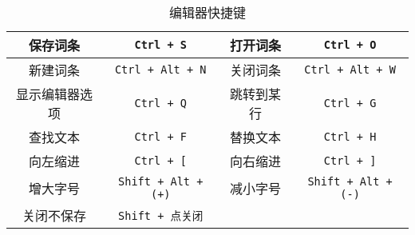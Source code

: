 \begin{table}[ht]
\centering
\caption{编辑器快捷键}\label{editor_tab1}
\begin{tabular}{|c|c|c|c|}
\hline
保存词条 & \lstinline|Ctrl + S| & 打开词条 & \lstinline|Ctrl + O| \\
\hline
新建词条 & \lstinline|Ctrl + Alt + N| & 关闭词条 & \lstinline|Ctrl + Alt + W| \\
\hline
显示编辑器选项 & \lstinline|Ctrl + Q| & 跳转到某行 & \lstinline|Ctrl + G| \\
\hline
查找文本 & \lstinline|Ctrl + F| & 替换文本 & \lstinline|Ctrl + H| \\
\hline
向左缩进 & \lstinline|Ctrl + [| & 向右缩进 & \lstinline|Ctrl + ]| \\
\hline
增大字号 & \lstinline|Shift + Alt + (+)| & 减小字号 & \lstinline|Shift + Alt + (-)| \\
\hline
关闭不保存 & \lstinline|Shift + 点关闭| &  &  \\
\hline
\end{tabular}
\end{table}
